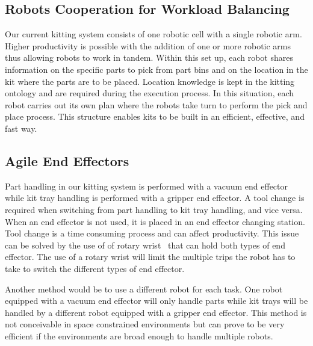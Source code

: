 \documentclass[final,3p,12pt]{elsarticle}
\begin{document}


\subsection{Robots Cooperation for Workload Balancing}
Our current kitting system consists of one robotic cell with a single robotic arm. Higher productivity is possible with the addition of one or more robotic arms thus allowing robots to work in tandem. Within this set up, each robot shares information on the specific parts to pick from part bins and on the location in the kit where the parts are to be placed. Location knowledge is kept in the kitting ontology and are required during the execution process. In this situation, each robot carries out its own plan where the robots take turn to perform the pick and place process. This structure enables kits to be built in an efficient, effective, and fast way.

\subsection{Agile End Effectors}
Part handling in our kitting system is performed with a vacuum end effector while kit tray handling is performed with a gripper end effector. A tool change is required when switching from part handling to kit tray handling, and vice versa. When an end effector is not used, it is placed in an end effector changing station. Tool change is a time consuming process and can affect productivity. This issue can be solved by the use of of rotary wrist~\cite{QUINN.1997} that can hold both types of end effector. The use of a rotary wrist will limit the multiple trips the robot has to take to switch the different types of end effector.

Another method would be to use a different robot for each task. One robot equipped with a vacuum end effector will only handle parts while kit trays will be handled by a different robot equipped with a gripper end effector. This method is not conceivable in space constrained environments but can prove to be very efficient if the environments are broad enough to handle multiple robots.
\end{document}
